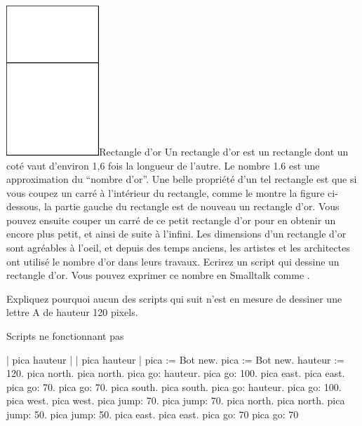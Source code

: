 \documentclass[a4paper,10pt,twoside]{book}
\begin{document}
\begin{exofigwithsizeandtitle}[0.6]{\includegraphics[width=3.5cm]{varGoldenRec}}{Rectangle d'or}
Un rectangle d'or est un rectangle dont un cot\'e vaut d'environ 1,6 fois la longueur de l'autre. Le nombre 1.6 est une approximation du ``nombre d'or''. Une belle propri\'et\'e d'un tel rectangle est que si vous coupez un carr\'e \`a l'int\'erieur du rectangle, comme le montre la figure ci-dessous, la partie gauche du rectangle est de nouveau un rectangle d'or. Vous pouvez ensuite couper un carr\'e de ce petit rectangle d'or pour en obtenir un encore plus petit, et ainsi de suite \`a l'infini. Les dimensions d'un rectangle d'or sont agr\'eables \`a l'oeil, et depuis des temps anciens, les artistes et les architectes ont utilis\'e le nombre d'or dans leurs travaux. Ecrirez un script qui dessine un rectangle d'or. Vous pouvez exprimer ce nombre en Smalltalk comme . 

\end{exofigwithsizeandtitle}

Expliquez pourquoi aucun des scripts qui suit n'est en mesure de dessiner une lettre A de hauteur 120 pixels. 

\begin{exonofigtitle}{Scripts ne fonctionnant pas}
\begin{code}{}
| pica hauteur |                      | pica hauteur | 
pica := Bot new.                     pica := Bot new. 
hauteur := 120.                       pica north. 
pica north.                          pica go: hauteur. 
pica go: 100.                        pica east. 
pica east.                           pica go: 70. 
pica go: 70.                         pica south. 
pica south.                          pica go: hauteur. 
pica go: 100.                        pica west. 
pica west.                           pica jump: 70. 
pica jump: 70.                       pica north. 
pica north.                          pica jump: 50. 
pica jump: 50.                       pica east. 
pica east.                           pica go: 70 
pica go: 70 	
\end{code}
\end{exonofigtitle}
\end{document}
